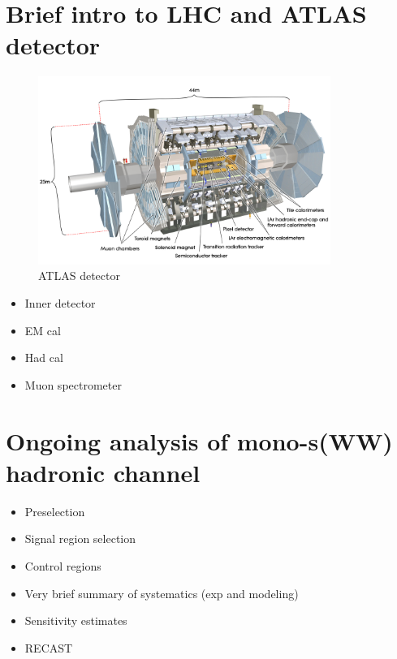 \documentclass[12pt]{article}
\begin{document}
\section{Brief intro to LHC and ATLAS detector}
\begin{figure}[H]
	\centering
	\includegraphics[width=0.85\textwidth]{figures/detector.jpg}
	\caption{ATLAS detector}
	\label{fig:detector}
\end{figure}
\begin{itemize}
\item Inner detector
\item EM cal
\item Had cal
\item Muon spectrometer
\end{itemize}

\section{Ongoing analysis of mono-s(WW) hadronic channel}
\begin{itemize}
\item Preselection
\item Signal region selection
\item Control regions
\item Very brief summary of systematics (exp and modeling)
\item Sensitivity estimates
\item RECAST
\end{itemize}
\end{document}
